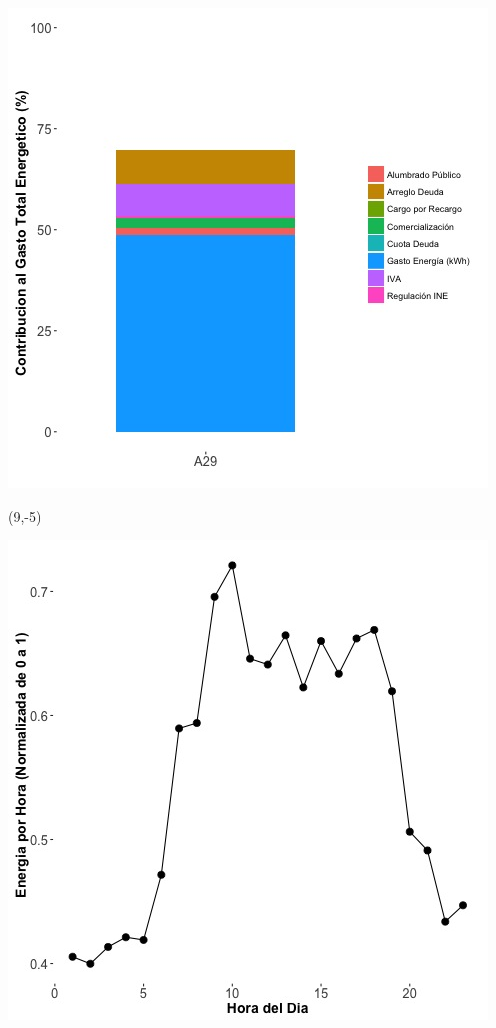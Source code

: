 \documentclass{article}\usepackage[]{graphicx}\usepackage[]{color}
\newenvironment{knitrout}{}{} %
\begin{document}
\begin{knitrout}
\color{fgcolor}
\includegraphics[scale=0.65]{figure/A29_costvars_plot.jpg} 
\end{knitrout}

 \begin{textblock}{1}(9,-5)
\begin{minipage}{20em}
\begingroup

\endgroup
\end{minipage}
\end{textblock}

\begin{knitrout}
\color{fgcolor}
\includegraphics[scale=0.65]{figure/A29_plot_norm_median} 
\end{knitrout}
\end{document}
